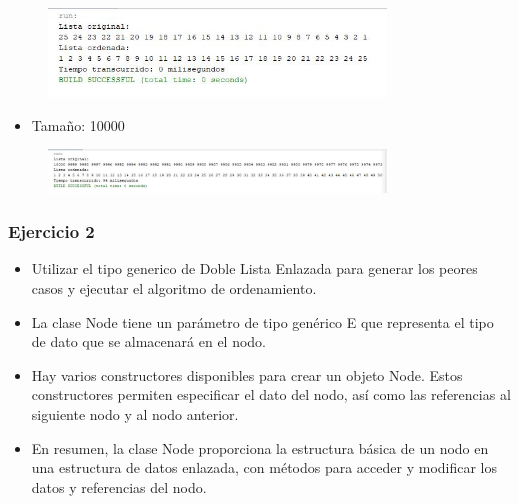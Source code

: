 \documentclass{article}
\begin{document}
	\begin{figure}[H]
		\centering
		\includegraphics[width=0.8\textwidth,keepaspectratio]{img/ej1.jpg}
	\end{figure}	
	
	\begin{itemize}
		\item Tamaño: 10000
	\end{itemize}
	
	\begin{figure}[H]
		\centering
		\includegraphics[width=0.8\textwidth,keepaspectratio]{img/ej2.jpg}
	\end{figure}
	
	\subsubsection{Ejercicio 2}
	\begin{itemize}
		\item Utilizar el tipo generico de Doble Lista Enlazada para generar los peores casos y ejecutar el	algoritmo de ordenamiento.
	\end{itemize}
	
	
	
	\begin{itemize}
		\item La clase Node tiene un parámetro de tipo genérico E que representa el tipo de dato que se almacenará en el nodo.
		\item Hay varios constructores disponibles para crear un objeto Node. Estos constructores permiten especificar el dato del nodo, así como las referencias al siguiente nodo y al nodo anterior.
		\item En resumen, la clase Node proporciona la estructura básica de un nodo en una estructura de datos enlazada, con métodos para acceder y modificar los datos y referencias del nodo.
	\end{itemize}
	
\end{document}
